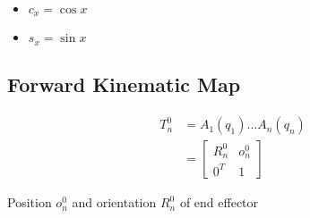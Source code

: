    \begin{itemize}
      \item $ c_{x} = \cos x $
      \item $ s_{x} = \sin x $
    \end{itemize}

  \subsection{Forward Kinematic Map}

    \begin{align}
      T^{0}_{n}
        &= A_{1}\left( q_{1} \right) ... A_{n}\left( q_{n} \right) \\
        &=
        \begin{bmatrix}
          R^{0}_{n} & o^{0}_{n} \\
          0^{T} & 1
        \end{bmatrix}
    \end{align}

    Position $ o^{0}_{n} $ and orientation $ R^{0}_{n} $ of end effector
